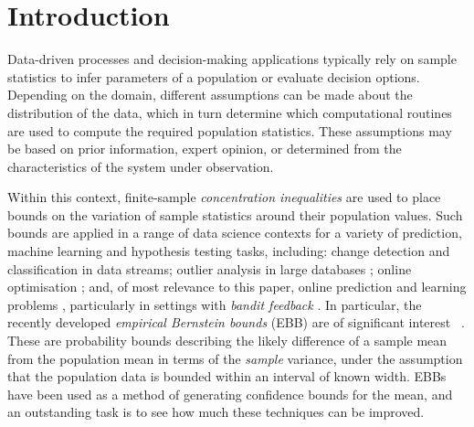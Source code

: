 \documentclass[runningheads, envcountsame, a4paper]{llncs}
\begin{document}
\section{Introduction}

Data-driven processes and decision-making applications typically rely on sample statistics 
to infer parameters of a population or evaluate decision options.
Depending on the domain, different assumptions can be made about the distribution of the data, 
which in turn determine which computational routines are used to compute the required population statistics. 
These assumptions may be based on prior information, expert opinion, or 
determined from the characteristics of the system under observation.

Within this context, finite-sample \textit{concentration inequalities} are used to place bounds on 
the variation of sample statistics around their population values.
Such bounds are applied in a range of data science contexts for a variety of prediction, machine learning and hypothesis testing tasks, including:
change detection \cite{KiferShaiGehrke2004,8000571} 
and classification \cite{Zia-UrRehman2012} in data streams;
outlier analysis in large databases \cite{Aggarwal2015};
online optimisation \cite{FlaxmanKalaiMcMahan2005,AgarwalDekelXiao2010}; and, of most relevance to this paper, 
online prediction and learning problems \cite{Cesa-BianchiLugosi2006,%
Mnih:2008:EBS:1390156.1390241,DBLP:conf/aaai/ThomasTG15,Maurer50empiricalbernstein},
particularly in settings with \textit{bandit feedback} \cite{AuerCesa-BianchiEtal_SIAM2003,AudibertBubeck_COLT2009,Tran-ThanhChapmanRJ_AAAI2009}. 
%
In particular, the recently developed \textit{empirical Bernstein bounds} (EBB) are of significant interest ~\cite{Maurer50empiricalbernstein,10.1007/978-3-540-75225-7_15}. 
These are probability bounds describing the likely difference of a sample mean from the population mean 
in terms of the \textit{sample} variance, 
under the assumption that the population data is bounded within an interval of known width.
EBBs have been used as a method of generating confidence bounds for the mean, and an outstanding task is to see how much these techniques can be improved.
\end{document}
